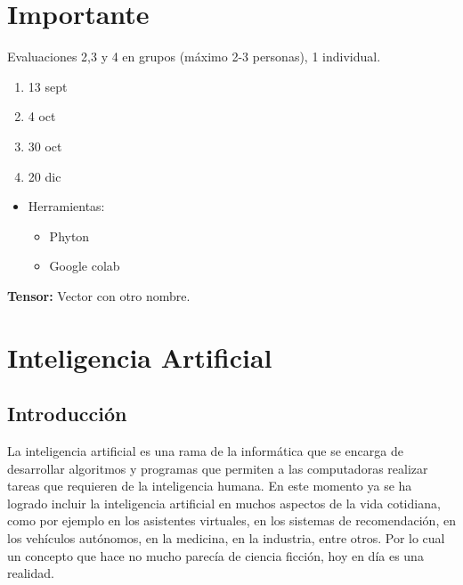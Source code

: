 \documentclass{templateNote}
\begin{document}


\portada
\margenes 
\tableofcontents
\newpage



\section{Importante}
\noindent Evaluaciones 2,3 y 4 en grupos (máximo 2-3 personas), 1 individual.

\begin{enumerate}
    \item 13 sept
    \item 4 oct
    \item 30 oct
    \item 20 dic
\end{enumerate}

\begin{itemize}
    \item Herramientas:
    \begin{itemize}
        \item Phyton
        \item Google colab
    \end{itemize}
\end{itemize}

\noindent\textbf{Tensor:} Vector con otro nombre.

\newpage
\section{Inteligencia Artificial}
\subsection{Introducción}
La inteligencia artificial es una rama de la informática que se encarga de desarrollar algoritmos y programas que permiten a las computadoras realizar tareas que requieren de la inteligencia humana. En este momento ya se ha logrado incluir la inteligencia artificial en muchos aspectos de la vida cotidiana, como por ejemplo en los asistentes virtuales, en los sistemas de recomendación, en los vehículos autónomos, en la medicina, en la industria, entre otros. Por lo cual un concepto que hace no mucho parecía de ciencia ficción, hoy en día es una realidad.
\end{document}
